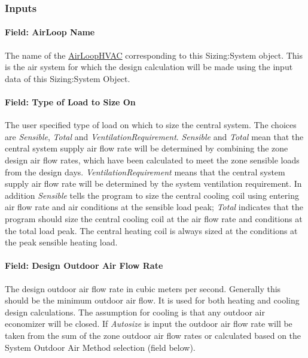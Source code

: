 \subsubsection{Inputs}\label{inputs-6-006}

\paragraph{Field: AirLoop Name}\label{field-airloop-name}

The name of the \hyperref[airloophvac]{AirLoopHVAC} corresponding to this Sizing:System object. This is the air system for which the design calculation will be made using the input data of this Sizing:System Object.

\paragraph{Field: Type of Load to Size On}\label{field-type-of-load-to-size-on}

The user specified type of load on which to size the central system. The choices are \emph{Sensible}, \emph{Total} and \emph{VentilationRequirement}. \emph{Sensible} and \emph{Total} mean that the central system supply air flow rate will be determined by combining the zone design air flow rates, which have been calculated to meet the zone sensible loads from the design days. \emph{VentilationRequirement} means that the central system supply air flow rate will be determined by the system ventilation requirement. In addition \emph{Sensible} tells the program to size the central cooling coil using entering air flow rate and air conditions at the sensible load peak; \emph{Total} indicates that the program should size the central cooling coil at the air flow rate and conditions at the total load peak. The central heating coil is always sized at the conditions at the peak sensible heating load.

\paragraph{Field: Design Outdoor Air Flow Rate}\label{field-design-outdoor-air-flow-rate}

The design outdoor air flow rate in cubic meters per second. Generally this should be the minimum outdoor air flow. It is used for both heating and cooling design calculations. The assumption for cooling is that any outdoor air economizer will be closed. If \emph{Autosize} is input the outdoor air flow rate will be taken from the sum of the zone outdoor air flow rates or calculated based on the System Outdoor Air Method selection (field below).

